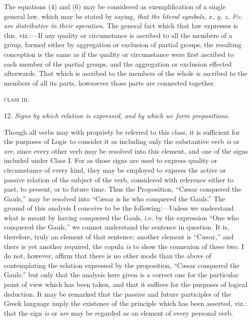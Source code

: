 \documentclass[oneside]{book}
\begin{document}
The equations (4) and (6) may be considered as exemplification
of a single general law, which may be stated by saying, \textit{that
the literal symbols, $x$, $y$, $z$, \&c. are distributive in their operation.}
The general fact which that law expresses is this, viz.:---If any
quality or circumstance is ascribed to all the members of a group,
formed either by aggregation or exclusion of partial groups, the
resulting conception is the same as if the quality or circumstance
were first ascribed to each member of the partial groups, and the
aggregation or exclusion effected afterwards. That which is
ascribed to the members of the whole is ascribed to the members
of all its parts, howsoever those parts are connected together.

\begin{center}
\textsc{class iii}.
\end{center}

12. \textit{Signs by which relation is expressed, and by which we
form propositions.}

Though all verbs may with propriety be referred to this class,
it is sufficient for the purposes of Logic to consider it as including
only the substantive verb \textit{is} or \textit{are}, since every other verb
may be resolved into this element, and one of the signs included
under Class I. For as those signs are used to express quality or
circumstance of every kind, they may be employed to express
the active or passive relation of the subject of the verb, considered
with reference either to past, to present, or to future time.
Thus the Proposition, ``C\ae{}sar conquered the Gauls,'' may be
resolved into ``C\ae{}sar is he who conquered the Gauls.'' The
ground of this analysis I conceive to be the following:---Unless
we understand what is meant by having conquered the Gauls,
i.e. by the expression ``One who conquered the Gauls,'' we
cannot understand the sentence in question. It is, therefore,
truly an element of that sentence; another element is ``C\ae{}sar,''
and there is yet another required, the copula \textit{is} to show the
connexion of these two. I do not, however, affirm that there is
no other mode than the above of contemplating the relation expressed
by the proposition, ``C\ae{}sar conquered the Gauls;'' but
only that the analysis here given is a correct one for the particular
point of view which has been taken, and that it suffices for
the purposes of logical deduction. It may be remarked that the
passive and future participles of the Greek language imply the
existence of the principle which has been asserted, viz.: that the
sign \textit{is} or \textit{are} may be regarded as an element of every personal
verb.
\end{document}

